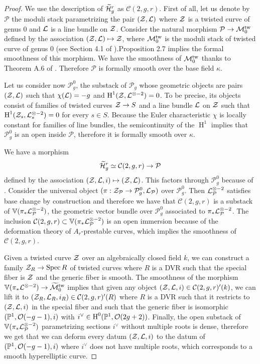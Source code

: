 \documentclass{alggeom}
\numberwithin{equation}{section}
\numberwithin{subsection}{section}
\theoremstyle{definition}
\theoremstyle{remark}
\newcommand\cC{\mathcal{C}} \newcommand\cD{\mathcal{D}}
\newcommand\cM{\mathcal{M}} \newcommand\cN{\mathcal{N}}
\newcommand\cO{\mathcal{O}} \newcommand\cP{\mathcal{P}}
\renewcommand\H{\operatorname{H}}
\newcommand\spec{\operatorname{Spec}}
\newcommand{\Mtilde}{\widetilde{\mathcal M}}
\newcommand{\Htilde}{\widetilde{\cH}}
\begin{document}
\begin{proof}
We use the description of $\Htilde_g^r$ as $\cC(2,g,r)$. First of all, let us denote by $\cP$ the moduli stack parametrizing the pair $(\mathcal{Z},\mathcal{L})$ where $\mathcal{Z}$ is a twisted curve of genus $0$ and $\mathcal{L}$ is a line bundle on $\mathcal{Z}$. Consider the natural morphism $\cP \rightarrow \cM_0^{\rm tw}$ defined by the association $(\mathcal{Z},\mathcal{L})\mapsto \mathcal{Z}$, where $\cM_0^{\rm tw}$ is the moduli stack of twisted curve of genus $0$ (see Section 4.1 of \cite{AbGrVis}).Proposition 2.7 \cite{AbOlVis} implies the  formal smoothness of this morphism. We have the smoothness of $\cM_0^{\rm tw}$ thanks to Theorem A.6 of \cite{AbOlVis}. Therefore $\cP$ is formally smooth over the base field $\kappa$.

 Let us consider now $\cP_g^0$, the substack of $\cP_g$ whose geometric objects are pairs $(\mathcal{Z},\mathcal{L})$ such that $\chi(\mathcal{L})=-g$ and $\H^1(\cZ,\cL^{\otimes -2})=0$. To be precise, its objects consist of families of twisted curves $\mathcal{Z}\rightarrow S$ and a line bundle $\mathcal{L}$ on $\mathcal{Z}$ such that $\H^1(\cZ_s,\cL_s^{\otimes -2})=0$ for every $s \in S$. Because the Euler characteristic $\chi$ is locally constant for families of line bundles, the semicontinuity of the $\H^1$  implies that $\cP_g^0$ is an open inside $\cP$, therefore it is formally smooth over $\kappa$.

 We have a morphism 
 $$ \Htilde_g^r\simeq \cC(2,g,r) \rightarrow \cP$$ 
 defined by the association $(\mathcal{Z},\mathcal{L},i) \mapsto (\mathcal{Z},\mathcal{L})$. This factors through $\cP_g^0$ because of . Consider the universal object $(\pi:\cZ_{\cP}\rightarrow \cP_g^0,\cL_{\cP})$ over $\cP_g^0$. Then $\cL_{\cP}^{\otimes -2}$ satisfies base change by construction and therefore we have that $\cC(2,g,r)$ is a substack of $\VV(\pi_*\cL_{\cP}^{\otimes -2})$, the geometric vector bundle over $\cP_g^0$ associated to $\pi_*\cL_{\cP}^{\otimes -2}$. The inclusion $\cC(2,g,r)\subset \VV(\pi_*\cL_{\cP}^{\otimes -2})$ is an open immersion because of the deformation theory of $A_r$-prestable curves, which implies the smoothness of $\cC(2,g,r)$. 
 
 Given a twisted curve $\mathcal{Z}$ over an algebraically closed field $k$, we can construct a family $\cZ_R\rightarrow \spec R$ of twisted curves where $R$ is a DVR such that the special fiber is $\mathcal{Z}$ and the generic fiber is smooth. The smoothness of the morphism $\VV(\pi_{*}\cL^{\otimes -2})\rightarrow \Mtilde_0^{\rm tw}$ implies that given any object $(\cZ,\cL,i) \in \cC(2,g,r)'(k)$, we can lift it to $(\cZ_R,\cL_R,i_R) \in \cC(2,g,r)'(R)$ where $R$ is a DVR such that it restricts to $(\mathcal{Z},\mathcal{L},i)$ in the special fiber and such that the generic fiber is isomorphic $(\PP^1, \cO(-g-1), i)$ with $i^{\vee} \in \H^0(\PP^1,\cO(2g+2))$. Finally, the open substack of $\VV(\pi_*\cL_{\cP}^{\otimes -2})$ parametrizing sections $i^{\vee}$ without multiple roots is dense, therefore we get that we can deform every datum $(\mathcal{Z},\mathcal{L},i)$ to the datum of $(\PP^1, \cO(-g-1), i)$ where $i^{\vee}$ does not have multiple roots, which corresponds to a smooth hyperelliptic curve.
\end{proof}
\end{document}
